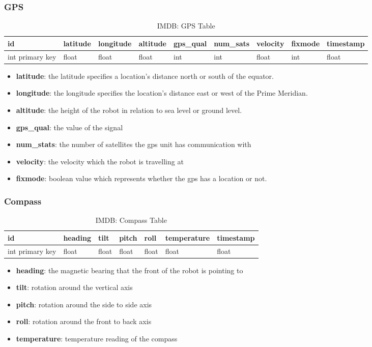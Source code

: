 \subsubsection{GPS}
\begin{table}[!htb]
\centering
\begin{tabular}{|l|l|l|l|l|l|l|l|l|}
\hline
id              & latitude & longitude & altitude & gps\_qual & num\_sats & velocity & fixmode & timestamp \\ \hline
int primary key & float    & float     & float    & int       & int       & float    & int     & float\\ \hline
\end{tabular}
\caption{IMDB: GPS Table}
\label{tab:db-gps}
\end{table}
\begin{itemize}
\item{\textbf{latitude}}: the latitude specifies a location's distance north or south of the equator.
\item{\textbf{longitude}}: the longitude specifies the location's distance east or west of the Prime Meridian.
\item{\textbf{altitude}}: the height of the robot in relation to sea level or ground level.
\item{\textbf{gps\_qual}}: the value of the signal
\item{\textbf{num\_stats}}: the number of satellites the gps unit has communication with
\item{\textbf{velocity}}: the velocity which the robot is travelling at
\item{\textbf{fixmode}}: boolean value which represents whether the gps has a location or not.  
\end{itemize}


\subsubsection{Compass}
\begin{table}[!htb]
\centering
\begin{tabular}{|l|l|l|l|l|l|l|}
\hline
id              & heading & tilt  & pitch & roll  & temperature & timestamp \\ \hline
int primary key & float   & float & float & float & float       & float \\ \hline
\end{tabular}
\caption{IMDB: Compass Table}
\label{tab:db-compass}
\end{table}
\begin{itemize}
\item{\textbf{heading}}: the magnetic bearing that the front of the robot is pointing to
\item{\textbf{tilt}}: rotation around the vertical axis
\item{\textbf{pitch}}: rotation around the side to side axis
\item{\textbf{roll}}: rotation around the front to back axis
\item{\textbf{temperature}}: temperature reading of the compass
\end{itemize}

